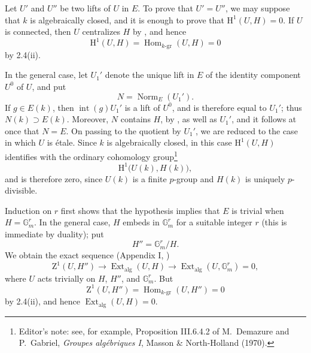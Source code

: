 
Let \(U'\) and \(U''\) be two lifts of \(U\) in \(E\).  To prove
that \(U'=U''\), we may suppose that \(k\) is algebraically closed,
and it is enough to prove that \(\mathrm H^1(U,H)=0\).  If \(U\)
is connected, then \(U\) centralizes \(H\) by , and hence
\[
  \mathrm H^1(U,H)
    =\operatorname{Hom}_{k\text{-}\mathrm{gr}}(U,H)=0
\]
by 2.4(ii).

In the general case, let \(U_1'\) denote the unique lift in \(E\)
of the identity component \(U^0\) of \(U\), and put
\[
  N=\operatorname{Norm}_{E}(U_1').
\]
If \(g\in E(k)\), then
\(\operatorname{int}(g)U_1'\) is a lift of \(U^0\), and is
therefore equal to \(U_1'\); thus \(N(k)\supset E(k)\).
Moreover, \(N\) contains \(H\), by , as well as \(U_1'\),
and it follows at once that \(N=E\).  On passing to the quotient
by \(U_1'\), we are reduced to the case in which \(U\) is étale.
Since \(k\) is algebraically closed, in this case
\(\mathrm H^1(U,H)\) identifies with the ordinary cohomology
group\footnote{Editor's note: see, for example, Proposition
III.6.4.2 of M.\ Demazure and P.\ Gabriel,
\emph{Groupes algébriques I}, Masson \& North-Holland (1970).}
\[
  \mathrm H^1\bigl(U(k),H(k)\bigr),
\]
and is therefore zero, since \(U(k)\) is a finite \(p\)-group and
\(H(k)\) is uniquely \(p\)-divisible.



Induction on \(r\) first shows that the hypothesis implies that
\(E\) is trivial when \(H=\mathbb G_m^r\).  In the general case,
\(H\) embeds in \(\mathbb G_m^r\) for a suitable integer \(r\)
(this is immediate by duality); put
\[
  H''=\mathbb G_m^r/H.
\]
We obtain the exact sequence (Appendix I, )
\[
  \mathrm Z^1(U,H'')
    \longrightarrow\operatorname{Ext}_{\mathrm{alg}}(U,H)
    \longrightarrow
      \operatorname{Ext}_{\mathrm{alg}}(U,\mathbb G_m^r)=0,
\]
where \(U\) acts trivially on \(H\), \(H''\), and
\(\mathbb G_m^r\).  But
\[
  \mathrm Z^1(U,H'')
    =\operatorname{Hom}_{k\text{-}\mathrm{gr}}(U,H'')=0
\]
by 2.4(ii), and hence
\(\operatorname{Ext}_{\mathrm{alg}}(U,H)=0\).

